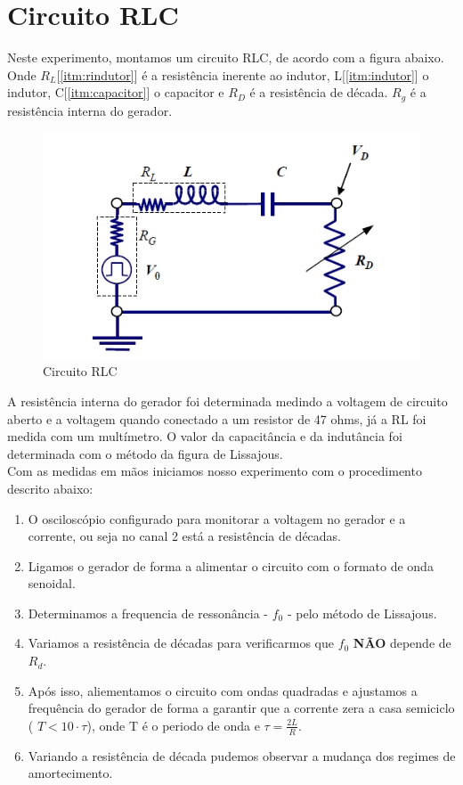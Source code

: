 \documentclass[12pt,letterpaper]{article}
\begin{document}
\section{Circuito RLC}
Neste experimento, montamos um circuito RLC, de acordo com a figura abaixo. Onde $R_L$[\ref{itm:rindutor}] é a resistência inerente ao indutor, L[\ref{itm:indutor}] o indutor, C[\ref{itm:capacitor}] o capacitor e $R_D$ é a resistência de década. $R_g$ é a resistência interna do gerador.
\begin{figure}[!htb]
  \centering
  \label{imgrlc}
  \includegraphics[scale=0.5]{img/rlc.jpg}
  \caption{Circuito RLC}
\end{figure}
A resistência interna do gerador foi determinada medindo a voltagem de circuito aberto e a voltagem quando conectado a um resistor de 47 ohms, já a RL foi medida com um multímetro. O valor da capacitância e da indutância foi determinada com o método da figura de Lissajous.\\
Com as medidas em mãos iniciamos nosso experimento com o procedimento descrito abaixo:
\begin{enumerate}[I]
\item O osciloscópio configurado para monitorar a voltagem no gerador e a corrente, ou seja no canal 2 está a resistência de décadas.
\item Ligamos o gerador de forma a alimentar o circuito com o formato de onda senoidal.
\item Determinamos a frequencia de ressonância - $f_0$ - pelo método de Lissajous.
\item Variamos a resistência de décadas para verificarmos que $f_0$ \textbf{NÃO} depende de $R_d$.
\item Após isso, aliementamos o circuito com ondas quadradas e ajustamos a frequência do gerador de forma a garantir que a corrente zera a casa semiciclo ( $ T < 10 \cdot \tau $), onde T é o periodo de onda e $\tau=\frac{2L}{R}$.
\item Variando a resistência de década pudemos observar a mudança dos regimes de amortecimento.
\end{enumerate}
\end{document}
